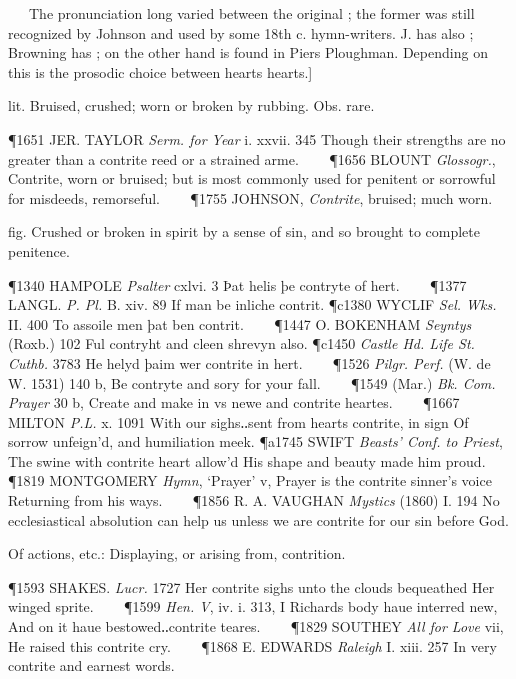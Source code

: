 \begin{description}[wide, labelwidth=!, labelindent=0pt]
   The pronunciation long varied between the original ; the former was still recognized by Johnson and used by some 18th c. hymn-writers. J. has also ; Browning has ; on the other hand  is found in Piers Ploughman. Depending on this is the prosodic choice between hearts  hearts.]
\vspace{-0.3cm}

\begin{myenumerate}

 lit. Bruised, crushed; worn or broken by rubbing. Obs. rare.

\P 1651 JER. TAYLOR  \textit{Serm. for Year} i. xxvii. 345 Though their strengths are no greater than a contrite reed or a strained arme.    
\P 1656 BLOUNT  \textit{Glossogr.}, Contrite, worn or bruised; but is most commonly used for penitent or sorrowful for misdeeds, remorseful.    
\P 1755 JOHNSON,  \textit{Contrite}, bruised; much worn.

 fig. Crushed or broken in spirit by a sense of sin, and so brought to complete penitence.

\P 1340 HAMPOLE  \textit{Psalter} cxlvi. 3 Þat helis þe contryte of hert.    
\P 1377 LANGL.  \textit{P. Pl.} B. xiv. 89 If man be inliche contrit.
\P c1380 WYCLIF  \textit{Sel. Wks.} II. 400 To assoile men þat ben contrit.    
\P 1447 O. BOKENHAM  \textit{Seyntys} (Roxb.) 102 Ful contryht and cleen shrevyn also.
\P c1450 \textit{Castle  Hd. Life St. Cuthb.} 3783 He helyd þaim wer contrite in hert.    
\P 1526  \textit{Pilgr. Perf.} (W. de W. 1531) 140 b, Be contryte and sory for your fall.    
\P 1549 (Mar.)  \textit{Bk. Com. Prayer} 30 b, Create and make in vs newe and contrite heartes.    
\P 1667 MILTON  \textit{P.L.} x. 1091 With  our sighs‥sent from hearts contrite, in sign Of sorrow unfeign'd, and humiliation meek.
\P a1745 SWIFT  \textit{Beasts' Conf. to Priest}, The swine with contrite heart allow'd His shape and beauty made him proud.    
\P 1819 MONTGOMERY  \textit{Hymn}, ‘Prayer’ v, Prayer is the contrite sinner's voice Returning from his ways.    
\P 1856 R. A. VAUGHAN  \textit{Mystics} (1860) I. 194 No ecclesiastical absolution can help us unless we are contrite for our sin before God.

 Of actions, etc.: Displaying, or arising from, contrition.

\P 1593 SHAKES. \textit{Lucr.} 1727 Her  contrite sighs unto the clouds bequeathed Her winged sprite.    
\P 1599 \textit{Hen. V}, iv. i. 313, I Richards body haue interred new, And on it haue bestowed‥contrite teares.    
\P 1829 SOUTHEY  \textit{All for Love} vii, He raised this contrite cry.    
\P 1868 E. EDWARDS  \textit{Raleigh} I. xiii. 257 In very contrite and earnest words.


\end{myenumerate}
\end{description}
